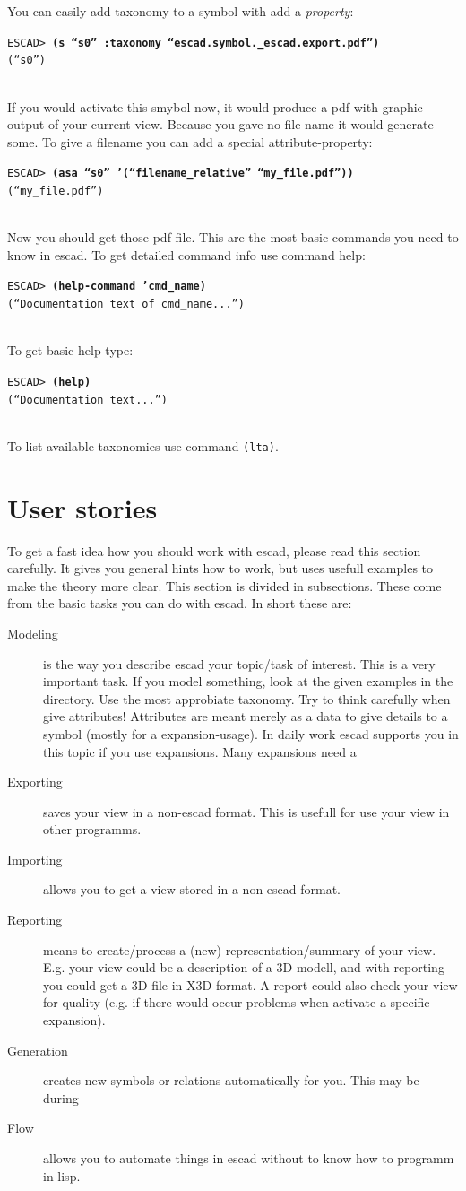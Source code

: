 \documentclass[a4paper, 12pt, openany]{scrbook}
\newcommand{\escadcmdline}[2]{\\\setlength{\fboxsep}{2pt}\colorbox{black!20}{\parbox{\textwidth}{\texttt{ESCAD> \textbf{#1}\\#2}}}\\}
\begin{document}
You can easily add taxonomy to a symbol with add a \emph{property}:
\escadcmdline{(s ``s0'' :taxonomy ``escad.symbol.\_escad.export.pdf'')}{(``s0'')}
If you would activate this smybol now, it would produce a pdf with graphic output of your current view. Because you gave no file-name it would generate some. To give a filename you can add a special attribute-property:
\escadcmdline{(asa ``s0'' '(``filename\_relative'' ``my\_file.pdf''))}{(``my\_file.pdf'')}
Now you should get those pdf-file.
This are the most basic commands you need to know in escad. To get detailed command info use command help:
\escadcmdline{(help-command 'cmd\_name)}{(``Documentation text of cmd\_name...'')}
To get basic help type:
\escadcmdline{(help)}{(``Documentation text...'')}
To list available taxonomies use command \texttt{(lta)}.
\section{User stories}
To get a fast idea how you should work with escad, please read this section carefully. It gives you general hints how to work, but uses usefull examples to make the theory more clear.
This section is divided in subsections. These come from the basic tasks you can do with escad. In short these are:
\begin{description}
\item[Modeling] is the way you describe escad your topic/task of interest. This is a very important task. If you model something, look at the given examples in the  directory. Use the most approbiate taxonomy. Try to think carefully when give attributes! Attributes are meant merely as a data to give details to a symbol (mostly for a expansion-usage). In daily work escad supports you in this topic if you use expansions. Many expansions need a 
\item[Exporting] saves your view in a non-escad format. This is usefull for use your view in other programms.
\item[Importing] allows you to get a view stored in a non-escad format.
\item[Reporting] means to create/process a (new) representation/summary of your view. E.g. your view could be a description of a 3D-modell, and with reporting you could get a 3D-file in X3D-format. A report could also check your view for quality (e.g. if there would occur problems when activate a specific expansion).
\item[Generation] creates new symbols or relations automatically for you. This may be during
\item[Flow] allows you to automate things in escad without to know how to programm in lisp.
\end{description}
\end{document}
